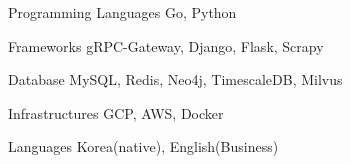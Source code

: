 

\begin{cvskills}

  \cvskill
    {Programming Languages} %
    {Go, Python} %

  \cvskill
    {Frameworks} %
    {gRPC-Gateway, Django, Flask, Scrapy} %

  \cvskill
    {Database} %
    {MySQL, Redis, Neo4j, TimescaleDB, Milvus} %

  \cvskill
    {Infrastructures} %
    {GCP, AWS, Docker} %

  \cvskill
    {Languages} %
    {Korea(native), English(Business)} %

\end{cvskills}
